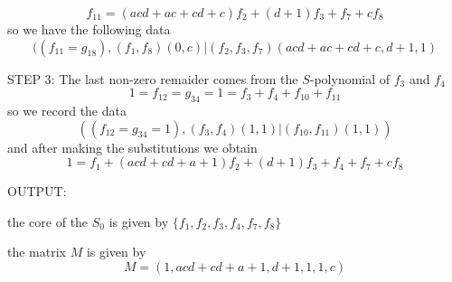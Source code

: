 \begin{exemp}
$$f_{11}=(acd+ac+cd+c)f_2+(d+1)f_3+f_7+cf_8$$
so we have the following data
$$((f_{11}=g_{18}), (f_1,f_8)(0,c)|(f_2,f_3,f_7)(acd+ac+cd+c,d+1,1)$$ 

STEP 3:
The last non-zero remaider comes from the $S$-polynomial of $f_3$ and $f_4$
$$1=f_{12}=g_{34}=1=f_3+f_4+f_{10}+f_{11}$$
so we record the data 
$$((f_{12}=g_{34}=1), (f_3,f_4)(1,1)|(f_{10},f_{11})(1,1))$$
and after making the substitutions we obtain
$$1= f_1 + (acd + cd + a + 1)f_2 + (d+1)f_3 + f_4 + f_7 + c f_8$$

OUTPUT:

the core of the $S_0$ is given by  $\{f_1,f_2,f_3,f_4,f_7,f_8\}$ 
 
the matrix $M$ is given by $$M=(1,acd + cd + a + 1,d+1,1,1,c)$$

\end{exemp}
